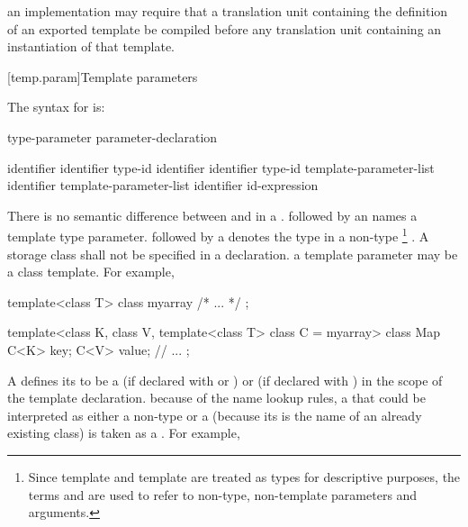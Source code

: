 \pnum
\enternote
an implementation may require that a translation unit containing the
definition of an exported template be compiled before any translation unit
containing an instantiation of that template.
\exitnote

[temp.param]{Template parameters}

\pnum
The syntax for
is:

\begin{bnf}
\br
  type-parameter\br
  parameter-declaration
\end{bnf}

\begin{bnf}
\br
   identifier\opt\br
   identifier\opt \terminal{=} type-id\br
   identifier\opt\br
   identifier\opt \terminal{=} type-id\br
   template-parameter-list  identifier\opt\br
   template-parameter-list  identifier\opt \terminal{=} id-expression
\end{bnf}

\pnum
There is no semantic difference between
and
in a
.
followed by an
names a template type parameter.
followed by a
denotes the type in a non-type \footnote{Since template
and template
are treated as types for descriptive purposes, the terms
and
are used to refer to non-type, non-template parameters and arguments.}
.
A storage class shall not be specified in a
declaration.
\enternote
a template parameter may be a class template.
For example,

\begin{codeblock}
template<class T> class myarray { /* ... */ };

template<class K, class V, template<class T> class C = myarray>
class Map {
	C<K> key;
	C<V> value;
	// ...
};
\end{codeblock}
\exitnoteb

\pnum
A
defines its
to be a
(if declared with
or
)
or
(if declared with
)
in the scope of the template declaration.
\enternote
because of the name lookup rules, a
that could be interpreted as either a non-type
or a
(because its
is the name of an already existing class) is taken as a
.
For example,

